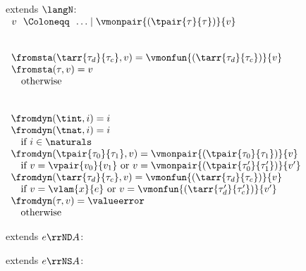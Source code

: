 \begin{flushleft}

\begin{minipage}[t]{0.5\textwidth}
 extends $\langN$:\\
$\begin{array}{l@{~~}c@{~~}l}
  v & \Coloneqq & \ldots \mid \vmonpair{(\tpair{\tau}{\tau})}{v}
\end{array}$

\medskip
{}\\
$\begin{array}{l}
  \fromsta(\tarr{\tau_d}{\tau_c}, v) = \vmonfun{(\tarr{\tau_d}{\tau_c})}{v}
\\
  \fromsta(\tau, v) = v
\\ \mbox{\quad otherwise}
\end{array}$
\end{minipage}%
\begin{minipage}[t]{0.5\textwidth}
\\
$\begin{array}{l}
  \fromdyn(\tint, i) = i
\\
  \fromdyn(\tnat, i) = i
\\ \mbox{\quad if $i \in \naturals$}
\\
  \fromdyn(\tpair{\tau_0}{\tau_1}, v) = \vmonpair{(\tpair{\tau_0}{\tau_1})}{v}
\\ \mbox{\quad if $v = \vpair{v_0}{v_1}$ or $v = \vmonpair{(\tpair{\tau_0'}{\tau_1'})}{v'}$}
\\
  \fromdyn(\tarr{\tau_d}{\tau_c}, v) = \vmonfun{(\tarr{\tau_d}{\tau_c})}{v}
\\ \mbox{\quad if $v = \vlam{x}{e}$ or $v = \vmonfun{(\tarr{\tau_d'}{\tau_c'})}{v'}$}
\\
  \fromdyn(\tau, v) = \valueerror
\\ \mbox{\quad otherwise}
\end{array}$
\end{minipage}


\medskip
\begin{minipage}[t]{0.5\textwidth}
 extends $e \rrND A$:
\begin{mathpar}

\end{mathpar}
\end{minipage}%
\begin{minipage}[t]{0.5\textwidth}
 extends $e \rrNS A$:
\begin{mathpar}


\end{mathpar}
\end{minipage}
\end{flushleft}

